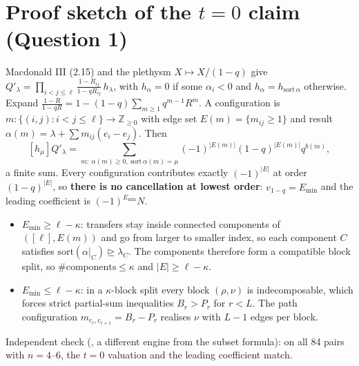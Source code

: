 \documentclass[10pt]{article}
\newcommand{\file}[1]{{\footnotesize\texttt{\detokenize{#1}}}}
\newcommand{\ka}{\kappa}
\begin{document}
\section{Proof sketch of the $t=0$ claim (Question 1)}
Macdonald III (2.15) and the plethysm $X\mapsto X/(1-q)$ give
$Q'_\lambda=\prod_{i<j\le\ell}\frac{1-R_{ij}}{1-qR_{ij}}\,h_\lambda$, with $h_\alpha=0$ if some $\alpha_i<0$ and
$h_\alpha=h_{\mathrm{sort}\,\alpha}$ otherwise. Expand $\frac{1-R}{1-qR}=1-(1-q)\sum_{m\ge1}q^{m-1}R^m$.
A configuration is $m:\{(i,j):i<j\le\ell\}\to\mathbb Z_{\ge0}$ with edge set $E(m)=\{m_{ij}\ge1\}$ and result
$\alpha(m)=\lambda+\sum m_{ij}(e_i-e_j)$. Then
\[
[h_\mu]Q'_\lambda=\sum_{m:\ \alpha(m)\ge0,\ \mathrm{sort}\,\alpha(m)=\mu}(-1)^{|E(m)|}(1-q)^{|E(m)|}q^{b(m)},
\]
a finite sum. Every configuration contributes exactly $(-1)^{|E|}$ at order $(1-q)^{|E|}$, so \textbf{there is no
cancellation at lowest order}: $v_{1-q}=E_{\min}$ and the leading coefficient is $(-1)^{E_{\min}}N$.
\begin{itemize}
\item $E_{\min}\ge\ell-\ka$: transfers stay inside connected components of $([\ell],E(m))$ and go from larger to smaller
index, so each component $C$ satisfies $\mathrm{sort}(\alpha|_C)\trianglerighteq\lambda_C$. The components therefore form a
compatible block split, so $\#\text{components}\le\ka$ and $|E|\ge\ell-\ka$.
\item $E_{\min}\le\ell-\ka$: in a $\ka$-block split every block $(\rho,\nu)$ is indecomposable, which forces strict partial-sum
inequalities $B_r>P_r$ for $r<L$. The path configuration $m_{c_r,c_{r+1}}=B_r-P_r$ realises $\nu$ with $L-1$ edges per block.
\end{itemize}
Independent check (\file{raising_t0.py}, a different engine from the subset formula): on all 84 pairs with $n=4$--$6$, the
$t=0$ valuation and the leading coefficient match.
\end{document}
